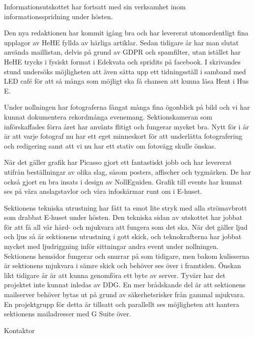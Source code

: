 \documentclass[../_main/handlingar.tex]{subfiles}
\begin{document}
\vspace{8px}
Informationsutskottet har fortsatt med sin verksamhet inom informationsspridning under hösten. 

Den nya redaktionen har kommit igång bra och har levererat utomordentligt fina upplagor av HeHE fyllda av härliga artiklar. Sedan tidigare år har man slutat använda maillistan, delvis på grund av GDPR och spamfilter, utan istället har HeHE trycks i fysiskt format i Edekvata och spridits på facebook. I skrivandes stund undersöks möjligheten att även sätta upp ett tidningsställ i samband med LED café för att så många som möjligt ska få chansen att kunna läsa Hent i Hus E. 

Under nollningen har fotograferna fångat många fina ögonblick på bild och vi har kunnat dokumentera rekordmånga evenemang. Sektionskameran som införskaffades förra året har använts flitigt och fungerar mycket bra. Nytt för i år är att varje fotograf nu har ett eget minneskort för att underlätta fotografering och redigering samt att vi nu har ett stativ om fotovägg skulle önskas.   

När det gäller grafik har Picasso gjort ett fantastiskt jobb och har levererat utifrån beställningar av olika slag, såsom posters, affischer och tygmärken. De har också gjort en bra insats i design av NollEguiden. Grafik till events har kunnat ses på våra anslagstavlor och våra infoskärmar runt om i E-huset. 

Sektionens tekniska utrustning har fått ta emot lite stryk med alla strömavbrott som drabbat E-huset under hösten. Den tekniska sidan av utskottet har jobbat för att få all vår hård- och mjukvara att fungera som det ska. När det gäller ljud och ljus så är sektionens utrustning i gott skick, och teknokrafterna har jobbat mycket med ljudriggning inför sittningar andra event under nollningen. Sektionens hemsidor fungerar och snurrar på som tidigare, men bakom kulisserna är sektionens mjukvara i sämre skick och behöver ses över i framtiden. Önskan likt tidigare år är att kunna genomföra ett byte av server. Tyvärr har det projektet inte kunnat inledas av DDG. En mer brådskande del är att sektionens mailserver behöver bytas ut på grund av säkerhetsrisker från gammal mjukvara. En projektgrupp för detta är tillsatt och parallellt ses möjligheten att hantera sektionens mailadresser med G Suite över. 



\begin{signatures}{1}
    \mvh
    \signature{Mattias Lundström}{Kontaktor}
\end{signatures}
\end{document}
